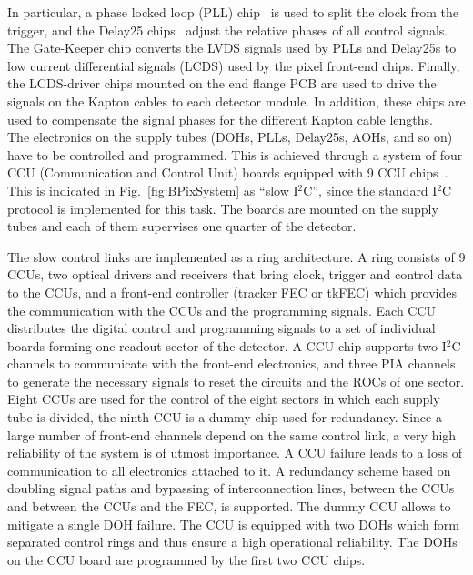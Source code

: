 In particular, a phase locked loop (PLL) chip~\cite{PLLmanual} is used to split the clock from the trigger, and the Delay25 chips~\cite{Delay25manual} adjust the relative phases of all control signals.
The Gate-Keeper chip converts the LVDS signals used by PLLs and Delay25s to low current differential signals (LCDS) used by the pixel front-end chips.
Finally, the LCDS-driver chips mounted on the end flange PCB are used to drive the signals on the Kapton cables to each detector module.
In addition, these chips are used to compensate the signal phases for the different Kapton cable lengths.\\

The electronics on the supply tubes (DOHs, PLLs, Delay25s, AOHs, and so on) have to be controlled and programmed.
This is achieved through a system of four CCU (Communication and Control Unit) boards equipped with 9 CCU chips~\cite{Paillard:593914}.
This is indicated in Fig.~\ref{fig:BPixSystem} as ``slow I$^2$C'', since the standard I$^2$C protocol is implemented for this task.
The boards are mounted on the supply tubes and each of them supervises one quarter of the detector.

The slow control links are implemented as a ring architecture.
A ring consists of 9 CCUs, two optical drivers and receivers that bring clock, trigger and control data to the CCUs,
and a front-end controller (tracker FEC or tkFEC)
which provides the communication with the CCUs and the programming signals.
Each CCU distributes the digital control and programming signals to a set of individual boards forming one readout sector of the detector.
A CCU chip supports two I$^2$C channels to communicate with the front-end electronics, and three PIA channels to generate the necessary signals to reset the circuits and the ROCs of one sector.
Eight CCUs are used for the control of the eight sectors in which each supply tube is divided, the ninth CCU is a dummy chip used for redundancy.
Since a large number of front-end channels depend on the same control link, a very high reliability of the system is of utmost importance.
A CCU failure leads to a loss of communication to all electronics attached to it.
A redundancy scheme based on doubling signal paths and bypassing of interconnection lines, between the CCUs and between the CCUs and the FEC, is supported.
The dummy CCU allows to mitigate a single DOH failure. The CCU is equipped with two DOHs which form separated control rings and thus ensure a high operational reliability.
The DOHs on the CCU board are programmed by the first two CCU chips.

